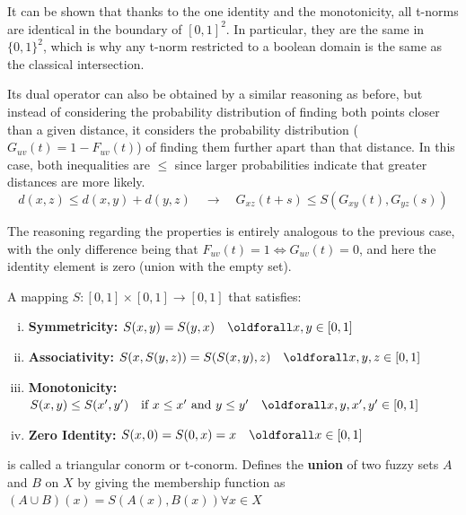 \begin{remark}
  It can be shown that thanks to the one identity and the monotonicity, all t-norms are identical in the boundary of $[0,1]^2$. In particular, they are the same in $\{0,1\}^2$, which is why any t-norm restricted to a boolean domain is the same as the classical intersection.
\end{remark}

Its dual operator can also be obtained by a similar reasoning as before, but instead of considering the probability distribution of finding both points closer than a given distance, it considers the probability distribution ($G_{uv}(t) = 1 - F_{uv}(t)$) of finding them further apart than that distance. In this case, both inequalities are $\leq$ since larger probabilities indicate that greater distances are more likely.
\begin{equation}\label{eq:Gtriangle_inequality}
d(x, z) \leq d(x, y) + d(y, z) \quad \longrightarrow \quad G_{xz}(t + s) \leq S(G_{xy}(t), G_{yz}(s))
\end{equation}

The reasoning regarding the properties is entirely analogous to the previous case, with the only difference being that $F_{uv}(t) = 1 \Leftrightarrow  G_{uv}(t) = 0$, and here the identity element is zero (union with the empty set).



\begin{definition}
  A mapping $S:[0,1]\times [0,1] \longrightarrow [0,1]$ that satisfies:
  \begin{enumerate}[(i)]\setlength{\itemindent}{2em}
    \item \textbf{Symmetricity:} $S(x,y) = S(y,x) \quad \oldforall x,y \in [0,1]$
    \item \textbf{Associativity:} $S(x,S(y,z)) = S(S(x,y),z) \quad \oldforall x,y,z \in [0,1]$
    \item \textbf{Monotonicity:} $S(x,y) \leq S(x',y') \quad \textnormal{if }x\leq x' \textnormal{ and } y\leq y' \quad \oldforall x,y,x',y' \in [0,1]$
    \item \textbf{Zero Identity:} $S(x,0) = S(0,x) = x \quad \oldforall x \in [0,1]$
  \end{enumerate}
  is called a triangular conorm or t-conorm. Defines the \textbf{union} of two fuzzy sets $A$ and $B$ on $X$ by giving the membership function as $(A \cup  B) (x) = S(A(x),B(x)) \forall x \in X$ 
    
\end{definition}

